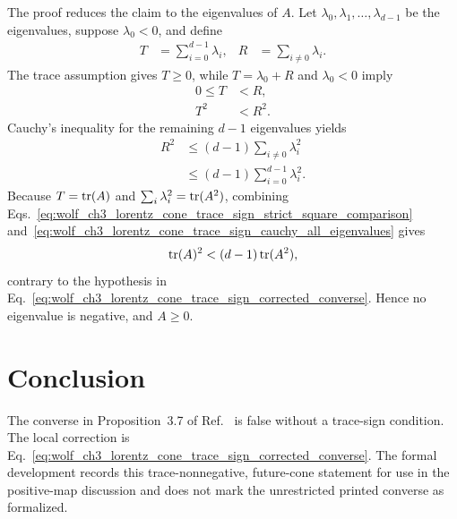 \documentclass{article}
\begin{document}
The proof reduces the claim to the eigenvalues of $A$. Let
$\lambda_0,\lambda_1,\ldots,\lambda_{d-1}$ be the eigenvalues, suppose
$\lambda_0<0$, and define
\begin{align}
    T&=\sum_{i=0}^{d-1}\lambda_i,
    &
    R&=\sum_{i\neq 0}\lambda_i.
    \label{eq:wolf_ch3_lorentz_cone_trace_sign_eigenvalue_sums}
\end{align}
The trace assumption gives $T\geq 0$, while $T=\lambda_0+R$ and
$\lambda_0<0$ imply
\begin{align}
    0\leq T&<R,
    \label{eq:wolf_ch3_lorentz_cone_trace_sign_strict_sum_comparison}\\
    T^2&<R^2.
    \label{eq:wolf_ch3_lorentz_cone_trace_sign_strict_square_comparison}
\end{align}
Cauchy's inequality for the remaining $d-1$ eigenvalues yields
\begin{align}
    R^2
        &\leq(d-1)\sum_{i\neq 0}\lambda_i^2
    \label{eq:wolf_ch3_lorentz_cone_trace_sign_cauchy_remaining_eigenvalues}\\
        &\leq(d-1)\sum_{i=0}^{d-1}\lambda_i^2.
    \label{eq:wolf_ch3_lorentz_cone_trace_sign_cauchy_all_eigenvalues}
\end{align}
Because $T=\operatorname{tr}(A)$ and $\sum_i\lambda_i^2=\operatorname{tr}(A^2)$, combining
Eqs.~\ref{eq:wolf_ch3_lorentz_cone_trace_sign_strict_square_comparison}
and~\ref{eq:wolf_ch3_lorentz_cone_trace_sign_cauchy_all_eigenvalues} gives
\begin{align}
    \operatorname{tr}(A)^2
        <(d-1)\operatorname{tr}(A^2),
    \label{eq:wolf_ch3_lorentz_cone_trace_sign_contradiction}
\end{align}
contrary to the hypothesis in
Eq.~\ref{eq:wolf_ch3_lorentz_cone_trace_sign_corrected_converse}. Hence no
eigenvalue is negative, and $A\geq 0$.

\section{Conclusion}

The converse in Proposition~3.7 of Ref.~\cite{Wolf2012Quantum} is false
without a trace-sign condition. The local correction is
Eq.~\ref{eq:wolf_ch3_lorentz_cone_trace_sign_corrected_converse}. The formal
development records this trace-nonnegative, future-cone statement for use in
the positive-map discussion and does not mark the unrestricted printed
converse as formalized.



\end{document}
